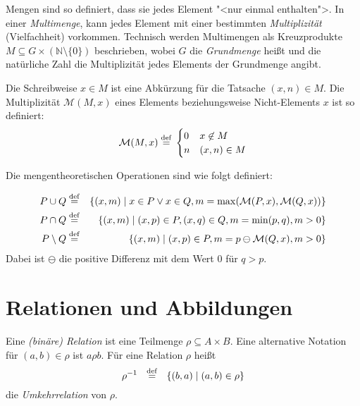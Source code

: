 Mengen sind so definiert, dass sie jedes Element "<nur einmal enthalten">. 
In einer \emph{Multimenge},
 kann jedes Element mit einer bestimmten
\emph{Multiplizität} (Vielfachheit) vorkommen.  Technisch werden
Multimengen als Kreuzprodukte $M \subseteq G \times (\mathbb{N}\setminus\{0\})$ beschrieben, wobei $G$
die \emph{Grundmenge} heißt und die natürliche Zahl die Multiplizität jedes Elements
der Grundmenge angibt.

Die Schreibweise $x\in M$ ist eine Abkürzung für
die Tatsache $(x,n)\in M$.  Die Multiplizität $\mathcal{M}(M, x)$ eines Elements beziehungsweise
Nicht-Elements $x$  ist so definiert:
%
\begin{displaymath}
  \mathcal{M}(M, x)\stackrel{\rm def}{=}{}
  \begin{cases}
    0 & x\not\in M\\
    n & (x, n)\in M
  \end{cases}
\end{displaymath}

Die mengentheoretischen Operationen sind wie folgt definiert:

\begin{eqnarray*}
  P\cup Q &\stackrel{\rm def}{=}& \{(x,m)\mid x\in P \vee x \in Q,
  m=\max(\mathcal{M}(P, x), \mathcal{M}(Q, x))\}\\
  P\cap Q &\stackrel{\rm def}{=}& \{(x,m)\mid(x,p)\in P, (x,q)\in Q, m=\min(p,q), m > 0\}\\
  P\setminus Q &\stackrel{\rm def}{=}& \{(x,m)\mid (x, p)\in P, m = p\ominus \mathcal{M}(Q, x), m > 0\}
\end{eqnarray*}
Dabei ist $\ominus$ die positive Differenz mit dem Wert $0$ für
$q>p$.

\section{Relationen und Abbildungen}
\label{sec:relationen}

\begin{definition} Eine \emph{(binäre) Relation}
ist eine Teilmenge $\rho \subseteq A \times B$.
Eine alternative Notation für $(a,b)\in\rho$ ist
$a\rho b$.
Für eine Relation $\rho$ heißt
\[ \rho^{-1}\ \ \stackrel{\rm def}{=}\ \ \{(b,a)\mid (a,b) \in \rho\}\]
die \emph{Umkehrrelation} 
von $\rho$. 
\end{definition}

